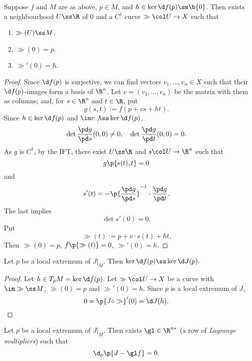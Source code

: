 \begin{lemma}
  Suppose $f$ and $M$ are as above, $p \in M$, and $h \in \ker \d f(p) \sm \b{0}$.
  Then exists a neighbourhood $U \ss \R$ of 0 and a $C^1$ curve $\gg \col U \to X$ such that
  \begin{enumerate}
    \item $\gg(U) \ss M$.
    \item $\gg(0) = p$.
    \item $\gg'(0) = h$.
  \end{enumerate} 
\end{lemma}

\begin{proof}
  Since $\d f(p)$ is surjective, we can find vectors $v_1, \dots, v_n \in X$ such that their $\d f(p)$-images form a basis of $\R^n$. Let $v = (v_1, \dots, v_n)$ be the matrix with them as columns; and, for $s \in \R^n$ and $t \in \R$, put
  $$ g(s, t) := f(p+vs+ht). $$
  Since $h \in \ker \d f(p)$ and $\im v \not \ss \ker \d f(p)$,
  $$ \det \frac{\pd g}{\pd s}(0, 0) \ne 0 , \quad \det \frac{\pd g}{\pd t}(0, 0) = 0. $$
  As $g$ is $C^1$, by the IFT, there exist $U \ss \R$ and $s \col U \to \R^n$ such that
  $$ g\p{s(t), t} = 0 $$
  and
  $$ s'(t) = -  \p{\frac{\pd g}{\pd s}}^{-1} \cdot \frac{\pd g}{\pd t}. $$
  The last implies
  $$ \det s'(0) = 0. $$
  Put
  $$ \gg(t) := p+v \cdot s(t)+ht. $$
  Then $\gg(0) = p$, $f\p{\gg(t)} = 0$, $\gg'(0) = h$.
\end{proof}

\begin{lemma}
  Let $p$ be a local extremum of $J|_M$.
  Then $\ker \d f(p) \ss \ker \d J(p).$
\end{lemma}

\begin{proof}
  Let $h \in T_pM = \ker \d f(p)$.
  Let $\gg \col U \to X$ be a curve with $\im \gg \ss M$, $\gg(0) = p$ and $\gg'(0) = h$.
  Since $p$ is a local extremum of $J$,
  $$ 0 = \p{J \circ \gg}'(0) = \d J(h). $$
\end{proof}

\begin{theorem}
  Let $p$ be a local extremum of $J|_M$.
  Then exists $\gl \in \R^{n*}$ (a row of \emph{Lagrange multipliers}) such that
  $$ \d_p \p{J-\gl f} = 0. $$
\end{theorem}

